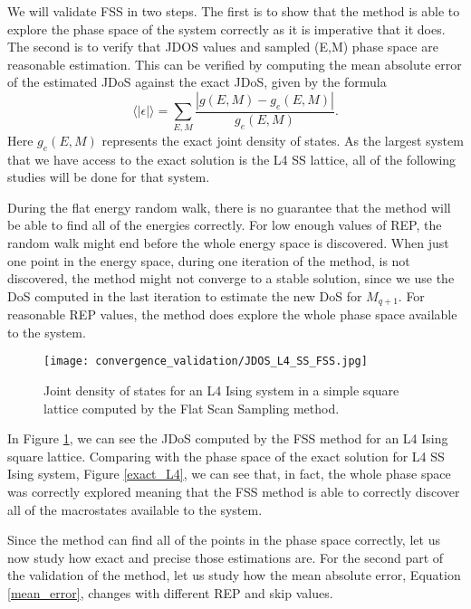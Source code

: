 	We will validate FSS in two steps. The first is to show that the method is able to explore the phase space of the system correctly as it is imperative that it does. The second is to verify that JDOS values and sampled (E,M) phase space are reasonable estimation. This can be verified by computing the mean absolute error of the estimated JDoS against the exact JDoS, given by the formula
\begin{equation}\label{mean_error}
	  \langle |\epsilon|\rangle = \sum_{E, M} \frac{|g(E, M) - g_e(E, M)|}{g_e(E, M)}.
\end{equation} 
Here $g_e(E, M)$ represents the exact joint density of states. As the largest system that we have access to the exact solution is the L4 SS lattice, all of the following studies will be done for that system.

	During the flat energy random walk, there is no guarantee that the method will  be able to find all of the energies correctly. For low enough values of REP, the random walk might end before the whole energy space is discovered. When just one point in the energy space, during one iteration of the method, is not discovered, the method might not converge to a stable solution, since we use the DoS computed in the last iteration to estimate the new DoS for $M_{q+1}$. For reasonable REP values, the method does explore the whole phase space available to the system.
\begin{figure}[h]
	\centering
	\texttt{[image: convergence\_validation/JDOS\_L4\_SS\_FSS.jpg]}
	\caption{Joint density of states for an L4 Ising system in a simple square lattice computed by the Flat Scan Sampling method. }
	\label{jdos_est}
\end{figure}	

\pagebreak
	
	In Figure \ref{jdos_est}, we can see the JDoS computed by the FSS method for an L4 Ising square lattice. Comparing with the phase space of the exact solution for L4 SS Ising system, Figure \ref{exact_L4}, we can see that, in fact, the whole phase space was correctly explored meaning that the FSS method is able to correctly discover all of the macrostates available to the system. 

	Since the method can find all of the points in the phase space correctly, let us now study how exact and precise those estimations are. For the second part of the validation of the method, let us study how the mean absolute error, Equation \ref{mean_error}, changes with different REP and skip values.

